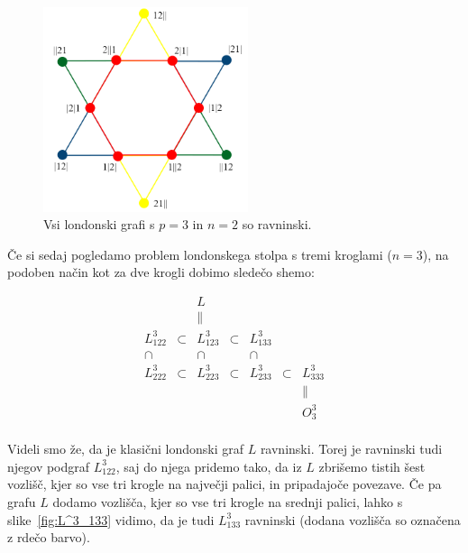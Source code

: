 \documentclass[twoside,11pt]{article}
\begin{document}
\begin{figure}[h]
    \includegraphics[width=170pt]{img/tolgraph-2balls.png}
    \caption{Vsi londonski grafi s $p=3$ in $n=2$ so ravninski.}
    \label{fig:graf-2krogli}
\end{figure}

Če si sedaj pogledamo problem londonskega stolpa s tremi kroglami ($n=3$), na podoben način kot za dve krogli dobimo sledečo shemo:

\begin{equation}
\label{eq:grafi-3krogle}
\begin{matrix}
& & L & & & & \\
& & \parallel & & & & \\
L_{122}^3 & \subset & L_{123}^3 & \subset & L_{133}^3 & & \\
\cap & & \cap & & \cap & & \\
L_{222}^3 & \subset & L_{223}^3 & \subset & L_{233}^3 & \subset & L_{333}^3 \\
& & & & & & \parallel \\
& & & & & & O^3_3 \\
\end{matrix}
\end{equation}

\smallskip

Videli smo že, da je klasični londonski graf $L$ ravninski. Torej je ravninski tudi njegov podgraf $L_{122}^3$, saj do njega pridemo tako, da iz $L$ zbrišemo tistih šest vozlišč, kjer so vse tri krogle na največji palici, in pripadajoče povezave. 
Če pa grafu $L$ dodamo vozlišča, kjer so vse tri krogle na srednji palici, lahko s slike~\ref{fig:L^3_133} vidimo, da je tudi $L_{133}^3$ ravninski (dodana vozlišča so označena z rdečo barvo).
\end{document}
